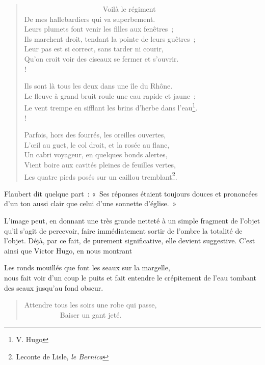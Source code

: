 \documentclass[french,twoside]{book} %
\begin{document}
\begin{verse}
                      Voilà le régiment\\
De mes hallebardiers qui va superbement.\\
Leurs plumets font venir les filles aux fenêtres ;\\
Ils marchent droit, tendant la pointe de leurs guêtres ;\\
Leur pas est si correct, sans tarder ni courir,\\
Qu’on croit voir des ciseaux se fermer et s’ouvrir.\\!

Ils sont là tous les deux dans une île du Rhône.\\
Le fleuve à grand bruit roule une eau rapide et jaune ;\\
Le vent trempe en sifflant les brins d’herbe dans l’eau\footnote{V. Hugo}.\\!

Parfois, hors des fourrés, les oreilles ouvertes,\\
L’œil au guet, le col droit, et la rosée au flanc,\\
Un cabri voyageur, en quelques bonds alertes,\\
Vient boire aux cavités pleines de feuilles vertes,\\
Les quatre pieds posés sur un caillou tremblant\footnote{ Leconte de Lisle, \emph{le Bernica}}.\\
\end{verse}

\noindent Flaubert dit quelque part : « Ses réponses étaient toujours douces et prononcées d’un ton aussi clair que celui d’une sonnette d’église. »\par
L’image peut, en donnant une très grande netteté à un simple fragment de l’objet qu’il s’agit de percevoir, faire immédiatement sortir de l’ombre la totalité de l’objet. Déjà, par ce fait, de purement significative, elle devient suggestive. C’est ainsi que Victor Hugo, en nous montrant\par

Les ronds mouillés que font les seaux sur la margelle,\\

\noindent nous fait voir d’un coup le puits et fait entendre le crépitement de l’eau tombant des seaux jusqu’au fond obscur.\par


\begin{verse}
Attendre tous les soirs une robe qui passe,\\
          Baiser un gant jeté.\\
\end{verse}
\end{document}
